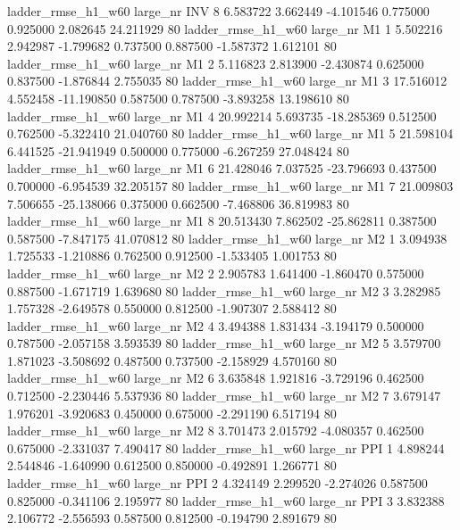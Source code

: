  ladder_rmse_h1_w60   large_nr      INV                 8  6.583722  3.662449  -4.101546 0.775000 0.925000  2.082645   24.211929 80
 ladder_rmse_h1_w60   large_nr       M1                 1  5.502216  2.942987  -1.799682 0.737500 0.887500 -1.587372    1.612101 80
 ladder_rmse_h1_w60   large_nr       M1                 2  5.116823  2.813900  -2.430874 0.625000 0.837500 -1.876844    2.755035 80
 ladder_rmse_h1_w60   large_nr       M1                 3 17.516012  4.552458 -11.190850 0.587500 0.787500 -3.893258   13.198610 80
 ladder_rmse_h1_w60   large_nr       M1                 4 20.992214  5.693735 -18.285369 0.512500 0.762500 -5.322410   21.040760 80
 ladder_rmse_h1_w60   large_nr       M1                 5 21.598104  6.441525 -21.941949 0.500000 0.775000 -6.267259   27.048424 80
 ladder_rmse_h1_w60   large_nr       M1                 6 21.428046  7.037525 -23.796693 0.437500 0.700000 -6.954539   32.205157 80
 ladder_rmse_h1_w60   large_nr       M1                 7 21.009803  7.506655 -25.138066 0.375000 0.662500 -7.468806   36.819983 80
 ladder_rmse_h1_w60   large_nr       M1                 8 20.513430  7.862502 -25.862811 0.387500 0.587500 -7.847175   41.070812 80
 ladder_rmse_h1_w60   large_nr       M2                 1  3.094938  1.725533  -1.210886 0.762500 0.912500 -1.533405    1.001753 80
 ladder_rmse_h1_w60   large_nr       M2                 2  2.905783  1.641400  -1.860470 0.575000 0.887500 -1.671719    1.639680 80
 ladder_rmse_h1_w60   large_nr       M2                 3  3.282985  1.757328  -2.649578 0.550000 0.812500 -1.907307    2.588412 80
 ladder_rmse_h1_w60   large_nr       M2                 4  3.494388  1.831434  -3.194179 0.500000 0.787500 -2.057158    3.593539 80
 ladder_rmse_h1_w60   large_nr       M2                 5  3.579700  1.871023  -3.508692 0.487500 0.737500 -2.158929    4.570160 80
 ladder_rmse_h1_w60   large_nr       M2                 6  3.635848  1.921816  -3.729196 0.462500 0.712500 -2.230446    5.537936 80
 ladder_rmse_h1_w60   large_nr       M2                 7  3.679147  1.976201  -3.920683 0.450000 0.675000 -2.291190    6.517194 80
 ladder_rmse_h1_w60   large_nr       M2                 8  3.701473  2.015792  -4.080357 0.462500 0.675000 -2.331037    7.490417 80
 ladder_rmse_h1_w60   large_nr      PPI                 1  4.898244  2.544846  -1.640990 0.612500 0.850000 -0.492891    1.266771 80
 ladder_rmse_h1_w60   large_nr      PPI                 2  4.324149  2.299520  -2.274026 0.587500 0.825000 -0.341106    2.195977 80
 ladder_rmse_h1_w60   large_nr      PPI                 3  3.832388  2.106772  -2.556593 0.587500 0.812500 -0.194790    2.891679 80
